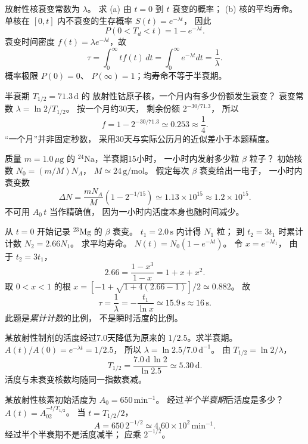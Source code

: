 放射性核衰变常数为 $\lambda$。
求 (a) 由 $t=0$ 到 $t$ 衰变的概率；
(b) 核的平均寿命。
\exsolution
单核在 $[0,t]$ 内不衰变的生存概率
$S(t)=e^{-\lambda t}$，
因此
\[
 \boxed{P(0<T_d<t)=1-e^{-\lambda t}}.
\]
衰变时间密度
$f(t)=\lambda e^{-\lambda t}$，故
\[
 \boxed{\tau=\int_0^\infty t f(t)\,dt
 =\int_0^\infty e^{-\lambda t}dt
 =\frac1{\lambda}}.
\]
\excheck 概率极限 $P(0)=0$、
$P(\infty)=1$；均寿命不等于半衰期。

半衰期 $T_{1/2}=71.3\,\mathrm d$ 的
放射性钴原子核，一个月内有多少份额发生衰变？
\exsolution
衰变常数
$\lambda=\ln2/T_{1/2}$。
按一个月约30天，
剩余份额 $2^{-30/71.3}$，
所以
\[
 \boxed{f=1-2^{-30/71.3}\simeq0.253
 \approx\frac14}.
\]
\excheck “一个月”并非固定秒数，
采用30天与实际公历月的近似差小于本题精度。

质量 $m=1.0\,\mu\mathrm g$ 的
$\mathrm{^{24}Na}$，半衰期15小时，
一小时内发射多少粒 $\beta$ 粒子？
\exsolution
初始核数
$N_0=(m/M)N_A$，
$M\simeq24\,\mathrm{g/mol}$。
假定每次 $\beta$ 衰变给出一电子，
一小时内衰变数
\[
 \boxed{\Delta N=
 \frac{mN_A}{M}
 \left(1-2^{-1/15}\right)
 \simeq1.13\times10^{15}\approx1.2\times10^{15}}.
\]
\excheck 不可用 $A_0\,t$ 当作精确值，
因为一小时内活度本身也随时间减少。

从 $t=0$ 开始记录
$\mathrm{^{23}Mg}$ 的 $\beta$ 衰变。
$t_1=2.0\,\mathrm s$ 内计得 $N_1$ 粒；
到 $t_2=3t_1$ 时累计计数
$N_2=2.66N_1$。
求平均寿命。
\exsolution
$N(t)=N_0(1-e^{-\lambda t})$。
令 $x=e^{-\lambda t_1}$，
由于 $t_2=3t_1$，
\[
 2.66=\frac{1-x^3}{1-x}=1+x+x^2.
\]
取 $0<x<1$ 的根
$x=[-1+\sqrt{1+4(2.66-1)}]/2\simeq0.882$。
故
\[
 \boxed{\tau=\frac1\lambda=
 -\frac{t_1}{\ln x}\simeq15.9\,\mathrm s
 \approx16\,\mathrm s}.
\]
\excheck 此题是\emph{累计计数}的比例，
不是瞬时活度的比例。

某放射性制剂的活度经过7.0天降低为原来的
$1/2.5$。求半衰期。
\exsolution
$A(t)/A(0)=e^{-\lambda t}=1/2.5$，
所以 $\lambda=\ln2.5/7.0\,\mathrm{d^{-1}}$。
由 $T_{1/2}=\ln2/\lambda$，
\[
 \boxed{T_{1/2}=
 \frac{7.0\,\mathrm d\,\ln2}{\ln2.5}
 \simeq5.30\,\mathrm d}.
\]
\excheck 活度与未衰变核数均随同一指数衰减。

某放射性核素初始活度为
$A_0=650\,\mathrm{min^{-1}}$。
经过\emph{半个半衰期}后活度是多少？
\exsolution
$A(t)=A_02^{-t/T_{1/2}}$。
当 $t=T_{1/2}/2$，
\[
 \boxed{A=650\,2^{-1/2}
 \simeq4.60\times10^2\,\mathrm{min^{-1}}}.
\]
\excheck 经过半个半衰期不是活度减半；
应乘 $2^{-1/2}$。

